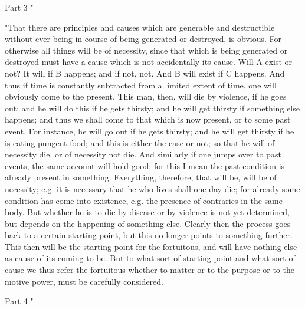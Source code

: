 Part 3 "

"That there are principles and causes which are generable and destructible
without ever being in course of being generated or destroyed, is obvious.
For otherwise all things will be of necessity, since that which is
being generated or destroyed must have a cause which is not accidentally
its cause. Will A exist or not? It will if B happens; and if not,
not. And B will exist if C happens. And thus if time is constantly
subtracted from a limited extent of time, one will obviously come
to the present. This man, then, will die by violence, if he goes out;
and he will do this if he gets thirsty; and he will get thirsty if
something else happens; and thus we shall come to that which is now
present, or to some past event. For instance, he will go out if he
gets thirsty; and he will get thirsty if he is eating pungent food;
and this is either the case or not; so that he will of necessity die,
or of necessity not die. And similarly if one jumps over to past events,
the same account will hold good; for this-I mean the past condition-is
already present in something. Everything, therefore, that will be,
will be of necessity; e.g. it is necessary that he who lives shall
one day die; for already some condition has come into existence, e.g.
the presence of contraries in the same body. But whether he is to
die by disease or by violence is not yet determined, but depends on
the happening of something else. Clearly then the process goes back
to a certain starting-point, but this no longer points to something
further. This then will be the starting-point for the fortuitous,
and will have nothing else as cause of its coming to be. But to what
sort of starting-point and what sort of cause we thus refer the fortuitous-whether
to matter or to the purpose or to the motive power, must be carefully
considered. 

Part 4 "

